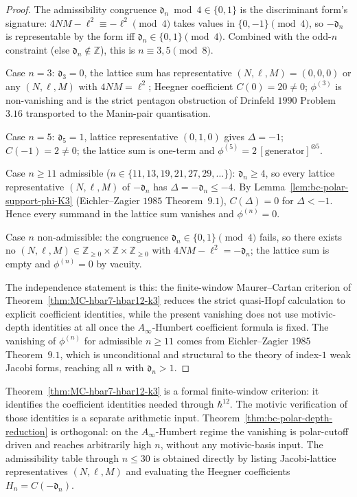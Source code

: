 \begin{proof}
The admissibility congruence $\mathfrak d_n \bmod 4 \in \{0, 1\}$ is the
discriminant form's signature: $4NM - \ell^2 \equiv -\ell^2 \pmod 4$
takes values in $\{0, -1\} \pmod 4$, so $-\mathfrak d_n$ is representable by the
form iff $\mathfrak d_n \in \{0, 1\} \pmod 4$. Combined with the odd-$n$
constraint (else $\mathfrak d_n \notin \mathbb{Z}$), this is $n \equiv 3, 5
\pmod 8$.

Case $n = 3$: $\mathfrak d_3 = 0$, the lattice sum has representative
$(N, \ell, M) = (0, 0, 0)$ or any $(N, \ell, M)$ with $4NM = \ell^2$;
Heegner coefficient $C(0) = 20 \ne 0$; $\phi^{(3)}$ is non-vanishing
and is the strict pentagon obstruction of Drinfeld $1990$ Problem
$3.16$ transported to the Manin-pair quantisation.

Case $n = 5$: $\mathfrak d_5 = 1$, lattice representative $(0, 1, 0)$ gives
$\Delta = -1$; $C(-1) = 2 \ne 0$; the lattice sum is one-term and
$\phi^{(5)} = 2\,[\mathrm{generator}]^{\otimes 5}$.

Case $n \ge 11$ admissible ($n \in \{11, 13, 19, 21, 27, 29, \ldots\}$):
$\mathfrak d_n \ge 4$, so every lattice representative $(N, \ell, M)$ of
$-\mathfrak d_n$ has $\Delta = -\mathfrak d_n \le -4$. By
Lemma~\ref{lem:bc-polar-support-phi-K3} (Eichler--Zagier $1985$
Theorem~$9.1$), $C(\Delta) = 0$ for $\Delta < -1$. Hence every
summand in the lattice sum vanishes and $\phi^{(n)} = 0$.

Case $n$ non-admissible: the congruence $\mathfrak d_n \in \{0, 1\} \pmod 4$
fails, so there exists no $(N, \ell, M)\in\mathbb{Z}_{\ge 0}\times
\mathbb{Z}\times\mathbb{Z}_{\ge 0}$ with $4NM - \ell^2 = -\mathfrak d_n$; the
lattice sum is empty and $\phi^{(n)} = 0$ by vacuity.

The independence statement is this: the finite-window
Maurer--Cartan criterion of
Theorem~\ref{thm:MC-hbar7-hbar12-k3} reduces the strict quasi-Hopf
calculation to explicit coefficient identities, while the present
vanishing does not use motivic-depth identities at all once the
$A_\infty$-Humbert coefficient formula is fixed. The vanishing of
$\phi^{(n)}$ for admissible $n \ge 11$ comes from Eichler--Zagier
$1985$ Theorem~$9.1$, which is unconditional and structural to the
theory of index-$1$ weak Jacobi forms, reaching all
$n$ with $\mathfrak d_n > 1$.
\end{proof}

\begin{remark}
\label{rem:bc-brown-horizon-contrast}
Theorem~\ref{thm:MC-hbar7-hbar12-k3} is a formal finite-window
criterion: it identifies the coefficient identities needed through
$\hbar^{12}$. The motivic verification of those identities is a
separate arithmetic input. Theorem~\ref{thm:bc-polar-depth-reduction}
is orthogonal: on the $A_\infty$-Humbert regime the vanishing is
polar-cutoff driven and reaches arbitrarily high $n$, without any
motivic-basis input. The
admissibility table through $n \le 30$ is obtained directly by listing
Jacobi-lattice representatives $(N,\ell,M)$ and evaluating the Heegner
coefficients $H_n=C(-\mathfrak d_n)$.
\end{remark}
